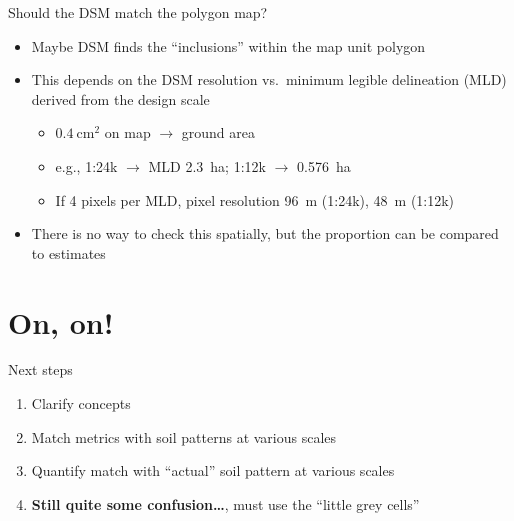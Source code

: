 \documentclass[aspectratio=169]{beamer}
\begin{document}
\begin{frame}{Should the DSM match the polygon map?}
    \begin{itemize}
        \item Maybe DSM finds the ``inclusions'' within the map unit polygon
        \item This depends on the DSM resolution vs.\ minimum legible delineation (MLD) derived from the design scale
        \begin{itemize}
            \item $0.4~\mathrm{cm}^2$ on map $\to$ ground area
            \item e.g., 1:24k $\to$ MLD 2.3~ha; 1:12k $\to$ 0.576~ha
            \item If 4 pixels per MLD, pixel resolution 96~m (1:24k), 48~m (1:12k)
        \end{itemize}
        \item There is no way to check this spatially, but the proportion can be compared to estimates
    \end{itemize}
\end{frame}
\section{On, on!}

\begin{frame}{Next steps}
\begin{enumerate}
    \item Clarify concepts
    \item Match metrics with soil patterns at various scales
    \item Quantify match with ``actual'' soil pattern at various scales
    \item \textbf{Still quite some confusion\ldots}, must use the ``little grey cells''
\end{enumerate}
\end{frame}


\end{document}
